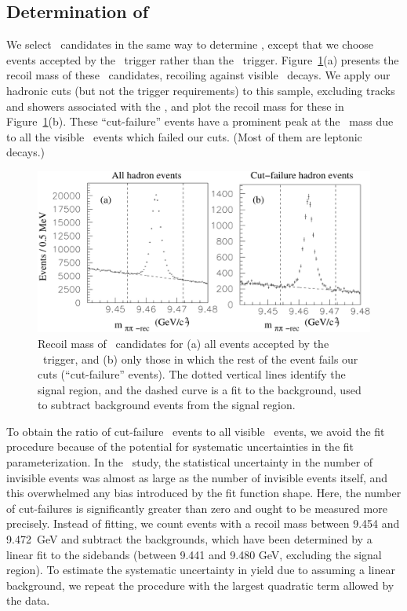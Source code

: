 \documentclass{cornell}
\begin{document}
\subsection{Determination of \boldmath \ecuts}

We select \pipi\ candidates in the same way to determine \ecuts,
except that we choose events accepted by the \hadron\ trigger rather
than the \twotrack\ trigger.  Figure~\ref{pipihadron}(a) presents the
recoil mass of these \pipi\ candidates, recoiling against visible \us\
decays.  We apply our hadronic cuts (but not the trigger requirements)
to this sample, excluding tracks and showers associated with the
\pipi, and plot the recoil mass for these in Figure~\ref{pipihadron}(b).  These ``cut-failure'' events have a prominent
peak at the \us\ mass due to all the visible \us\ events which failed
our cuts.  (Most of them are leptonic decays.)

\begin{figure}[p]
  \begin{center}
    \includegraphics[width=\linewidth]{plots/pipihadron}
  \end{center}
  \caption[\pipi\ recoil mass for events from the \hadron\
  trigger]{\label{pipihadron} Recoil mass of \pipi\ candidates for (a)
  all events accepted by the \hadron\ trigger, and (b) only those in
  which the rest of the event fails our cuts (``cut-failure'' events).
  The dotted vertical lines identify the signal region, and the dashed
  curve is a fit to the background, used to subtract background events
  from the signal region.}
\end{figure}

To obtain the ratio of cut-failure \us\ events to all visible \us\
events, we avoid the fit procedure because of the potential for
systematic uncertainties in the fit parameterization.  In the \evis\
study, the statistical uncertainty in the number of invisible events
was almost as large as the number of invisible events itself, and this
overwhelmed any bias introduced by the fit function shape.  Here, the
number of cut-failures is significantly greater than zero and ought to
be measured more precisely.  Instead of fitting, we count events with
a recoil mass between 9.454 and 9.472~GeV and subtract the 
backgrounds, which have been determined by a linear fit to the sidebands
(between 9.441 and 9.480 GeV, excluding the signal region).  To
estimate the systematic uncertainty in yield due to assuming a linear
background, we repeat the procedure with the largest quadratic term
allowed by the data.
\end{document}
